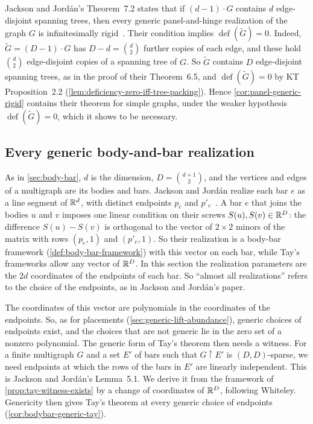 Jackson and Jord\'an's Theorem~7.2 states that if $(d-1) \cdot G$
contains $d$ edge-disjoint spanning trees, then every generic
panel-and-hinge realization of the graph $G$ is infinitesimally
rigid~\cite[\S7]{jacksonJordan2009}. Their condition implies
$\operatorname{def}(\tilde G) = 0$. Indeed, $\tilde G = (D-1) \cdot G$
has $D - d = \binom{d}{2}$ further copies of each edge, and these hold
$\binom{d}{2}$ edge-disjoint copies of a spanning tree of $G$. So
$\tilde G$ contains $D$ edge-disjoint spanning trees, as in the proof
of their Theorem~6.5, and $\operatorname{def}(\tilde G) = 0$ by KT
Proposition~2.2 (\cref{lem:deficiency-zero-iff-tree-packing}). Hence
\cref{cor:panel-generic-rigid} contains their theorem for simple
graphs, under the weaker hypothesis $\operatorname{def}(\tilde G) = 0$,
which it shows to be necessary.

\subsection{Every generic body-and-bar realization}
\label{sec:generic-lift-bodybar}

As in \cref{sec:body-bar}, $d$ is the dimension, $D = \binom{d+1}{2}$,
and the vertices and edges of a multigraph are its bodies and bars.
Jackson and Jord\'an realize each bar $e$ as a line segment of ${\mathbb{R}}^d$,
with distinct endpoints $p_e$ and
$p'_e$~\cite[\S\S2.1 and 3]{jacksonJordan2009}. A bar $e$ that joins
the bodies $u$ and $v$ imposes one linear condition on their screws
$S(u), S(v) \in {\mathbb{R}}^D$: the difference $S(u) - S(v)$ is orthogonal to
the vector of $2 \times 2$ minors of the matrix with rows $(p_e, 1)$
and $(p'_e, 1)$. So their realization is a body-bar framework
(\cref{def:body-bar-framework}) with this vector on each bar, while
Tay's frameworks allow any vector of ${\mathbb{R}}^D$. In this section the
realization parameters are the $2d$ coordinates of the endpoints of
each bar. So ``almost all realizations'' refers to the choice of the
endpoints, as in Jackson and Jord\'an's paper.

The coordinates of this vector are polynomials in the coordinates of
the endpoints. So, as for placements
(\cref{sec:generic-lift-abundance}), generic choices of endpoints
exist, and the choices that are not generic lie in the zero set of a
nonzero polynomial. The generic form of Tay's theorem then needs a
witness. For a finite multigraph $G$ and a set $E'$ of bars such that
$G \restriction E'$ is $(D, D)$-sparse, we need endpoints at which the
rows of the bars in $E'$ are linearly independent. This is Jackson and
Jord\'an's Lemma~5.1. We derive it from the framework of
\cref{prop:tay-witness-exists} by a change of coordinates of ${\mathbb{R}}^D$,
following Whiteley. Genericity then gives Tay's theorem at every
generic choice of endpoints (\cref{cor:bodybar-generic-tay}).

